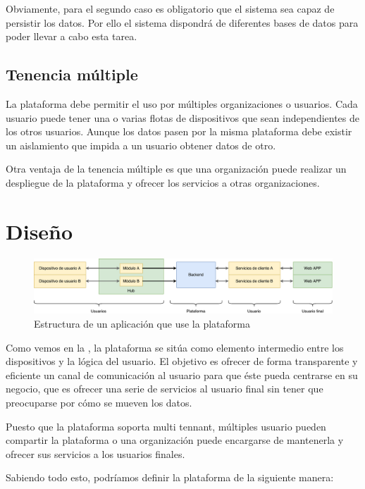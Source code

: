 Obviamente, para el segundo caso es obligatorio que el sistema sea capaz de
persistir los datos. Por ello el sistema dispondrá de diferentes bases de datos
para poder llevar a cabo esta tarea.

\subsection{Tenencia múltiple}

La plataforma debe permitir el uso por múltiples organizaciones o usuarios.
Cada usuario puede tener una o varias flotas de dispositivos que sean
independientes de los otros usuarios. Aunque los datos pasen por la misma
plataforma debe existir un aislamiento que impida a un usuario obtener datos de
otro.

Otra ventaja de la tenencia múltiple es que una organización puede realizar un
despliegue de la plataforma y ofrecer los servicios a otras organizaciones.

\section{Diseño}

\begin{figure}[htbp]
\centering
\includegraphics[width=\linewidth]{02-arquitectura/figuras/fig001}
\caption{Estructura de un aplicación que use la plataforma}
\label{fig:figura1}
\end{figure}

Como vemos en la , la plataforma se sitúa como elemento intermedio entre
los dispositivos y la lógica del usuario. El objetivo es ofrecer de forma
transparente y eficiente un canal de comunicación al usuario para que éste pueda
centrarse en su negocio, que es ofrecer una serie de servicios al usuario final
sin tener que preocuparse por cómo se mueven los datos.

Puesto que la plataforma soporta multi tennant, múltiples usuario pueden
compartir la plataforma o una organización puede encargarse de mantenerla y
ofrecer sus servicios a los usuarios finales.

Sabiendo todo esto, podríamos definir la plataforma de la siguiente manera:

